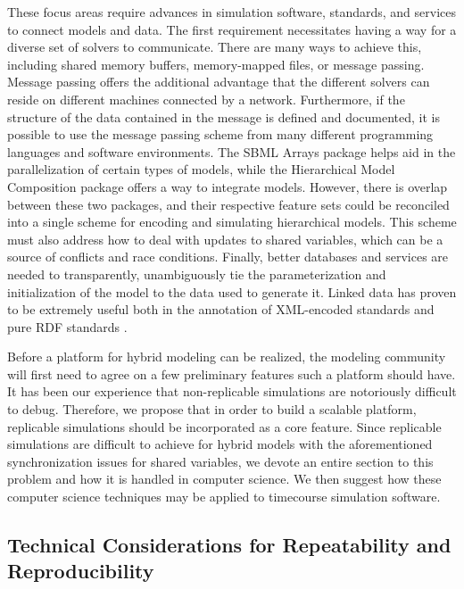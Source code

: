 \documentclass[journal,transmag,twoside]{IEEEtran}
\begin{document}
These focus areas require advances in simulation software, standards, and services to connect models and data. The first requirement necessitates having a way for a diverse set of solvers to communicate. There are many ways to achieve this, including shared memory buffers, memory-mapped files, or message passing. Message passing offers the additional advantage that the different solvers can reside on different machines connected by a network. Furthermore, if the structure of the data contained in the message is defined and documented, it is possible to use the message passing scheme from many different programming languages and software environments. The SBML Arrays package \cite{watanabe2016efficient} helps aid in the parallelization of certain types of models, while the Hierarchical Model Composition package \cite{smith2015sbml} offers a way to integrate models. However, there is overlap between these two packages, and their respective feature sets could be reconciled into a single scheme for encoding and simulating hierarchical models. This scheme must also address how to deal with updates to shared variables, which can be a source of conflicts and race conditions. Finally, better databases and services are needed to transparently, unambiguously tie the parameterization and initialization of the model to the data used to generate it. Linked data has proven to be extremely useful both in the annotation of XML-encoded standards \cite{novere2005minimum} and pure RDF standards \cite{galdzicki2014synthetic}.

Before a platform for hybrid modeling can be realized, the modeling community will first need to agree on a few preliminary features such a platform should have. It has been our experience that non-replicable simulations are notoriously difficult to debug. Therefore, we propose that in order to build a scalable platform, replicable simulations should be incorporated as a core feature. Since replicable simulations are difficult to achieve for hybrid models with the aforementioned synchronization issues for shared variables, we devote an entire section to this problem and how it is handled in computer science. We then suggest how these computer science techniques may be applied to timecourse simulation software.

\subsection{Technical Considerations for Repeatability and Reproducibility}
\end{document}
